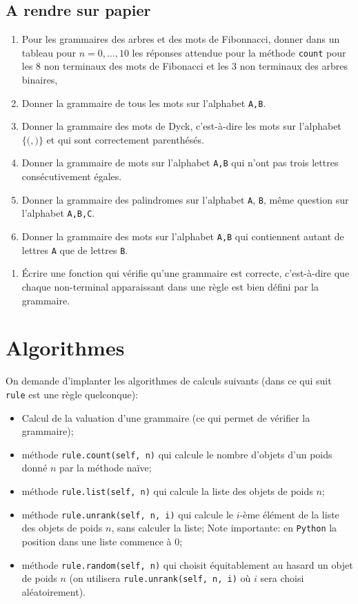 \documentclass[11pt]{article}
\newcounter{asuivre}
\newenvironment{ask}{\begin{enumerate}}%
                       {\setcounter{asuivre}{\theenumi}\end{enumerate}}
\newenvironment{asks}{\begin{enumerate}\setcounter{enumi}{\theasuivre}}%
                       {\setcounter{asuivre}{\theenumi}\end{enumerate}}
\newcommand{\Python}{\texttt{Python}}
\begin{document}
\subsection{A rendre sur papier}

\begin{ask}
\item Pour les grammaires des arbres et des mots de Fibonnacci, donner dans un
  tableau pour $n=0,\dots,10$ les réponses attendue pour la méthode
  \texttt{count} pour les $8$ non terminaux des mots de Fibonacci et les 3 non terminaux des arbres binaires,
\item Donner la grammaire de tous les mots sur l'alphabet \texttt{A,B}.
\item Donner la grammaire des mots de Dyck, c'est-à-dire les mots sur
  l'alphabet $\{\texttt{(}, \texttt{)}\}$ et qui sont correctement
  parenthésés.
\item Donner la grammaire de mots sur l'alphabet \texttt{A,B} qui n'ont pas
  trois lettres consécutivement égales.
\item Donner la grammaire des palindromes sur l'alphabet \texttt{A},
  \texttt{B}, même question sur l'alphabet \texttt{A,B,C}.
\item Donner la grammaire des mots sur l'alphabet \texttt{A,B} qui
  contiennent autant de lettres \texttt{A} que de lettres \texttt{B}.
\end{ask}

\begin{asks}
\item Écrire une fonction qui vérifie qu'une grammaire est correcte,
  c'est-à-dire que chaque non-terminal apparaissant dans une règle est bien
  défini par la grammaire.
\end{asks}



\section{Algorithmes}

On demande d'implanter les algorithmes de calculs suivants (dans ce qui suit
\texttt{rule} est une règle quelconque):
\begin{itemize}
\item Calcul de la valuation d'une grammaire (ce qui permet de vérifier la
  grammaire);
\item méthode \verb+rule.count(self, n)+ qui calcule le nombre d'objets d'un
  poids donné $n$ par la méthode naïve;
\item méthode \verb+rule.list(self, n)+ qui calcule la liste des objets de poids
  $n$;
\item méthode \verb+rule.unrank(self, n, i)+ qui calcule le $i$-ème élément de
  la liste des objets de poids $n$, sans calculer la liste; Note importante:
  en \Python{} la position dans une liste commence à $0$;
\item méthode \verb+rule.random(self, n)+ qui choisit équitablement au hasard
  un objet de poids $n$ (on utilisera \verb+rule.unrank(self, n, i)+ où $i$
  sera choisi aléatoirement).
\end{itemize}
\end{document}
